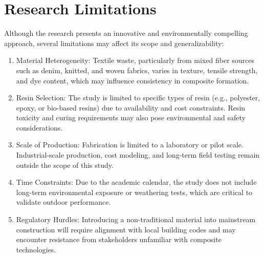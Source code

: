 \section{Research Limitations}
Although the research presents an innovative and environmentally compelling approach, several limitations may affect its scope and generalizability:

\begin{enumerate}
	\item Material Heterogeneity: Textile waste, particularly from mixed fiber sources such as denim, knitted, and woven fabrics, varies in texture, tensile strength, and dye content, which may influence consistency in composite formation.

	\item Resin Selection: The study is limited to specific types of resin (e.g., polyester, epoxy, or bio-based resins) due to availability and cost constraints. Resin toxicity and curing requirements may also pose environmental and safety considerations.

	\item Scale of Production: Fabrication is limited to a laboratory or pilot scale. Industrial-scale production, cost modeling, and long-term field testing remain outside the scope of this study.

	\item Time Constraints: Due to the academic calendar, the study does not include long-term environmental exposure or weathering tests, which are critical to validate outdoor performance.

	\item Regulatory Hurdles: Introducing a non-traditional material into mainstream construction will require alignment with local building codes and may encounter resistance from stakeholders unfamiliar with composite technologies.
\end{enumerate}